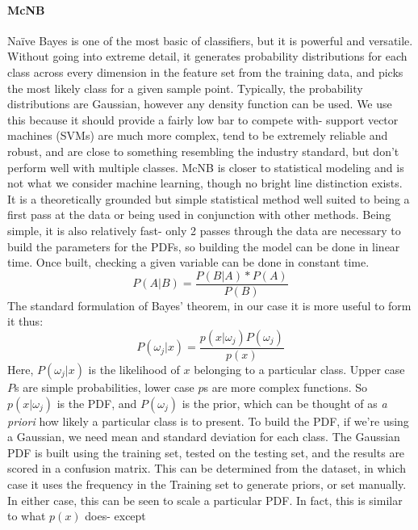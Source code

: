 \paragraph{McNB}
Na\"ive Bayes is one of the most basic of classifiers, but it is powerful and
versatile.  Without going into extreme detail, it generates probability
distributions for each class across every dimension in the feature set from the
training data, and picks the most likely class for a given sample point. 
Typically, the probability distributions are Gaussian, however any density
function can be used.   We use this because it should provide a fairly low bar
to compete with- support vector machines (SVMs) are much more complex, tend to
be extremely reliable and robust, and are close to something resembling the
industry standard, but don't perform well with multiple classes.  McNB is closer
to statistical modeling and is not what we consider machine learning, though no
bright line distinction exists.  It is a theoretically grounded but simple
statistical method well suited to being a first pass at the data or being used
in conjunction with other methods.  Being simple, it is also relatively fast-
only 2 passes through the data are necessary to build the parameters for the
PDFs, so building the model can be done in linear time.  Once built, checking a
given variable can be done in constant time.
\begin{equation}
P(A|B) = \frac{P(B|A)*P(A)}{P(B)}
\end{equation}
The standard formulation of Bayes' theorem, in our case it is more useful to
form it thus:
\begin{equation}
P(\omega_j|x) = \frac{p(x|\omega_j)P(\omega_j)}{p(x)}
\label{eq:bayes}
\end{equation}
Here, $P(\omega_j|x)$ is the likelihood of $x$ belonging to a particular class.  Upper
case $P$s are simple probabilities, lower case $p$s are more complex functions.
So $p(x|\omega_j)$ is the PDF, and $P(\omega_j)$ is the prior, which can be
thought of as \textit{a priori} how likely a particular class is to present.  To
build the PDF, if we're using a Gaussian, we need mean and standard deviation
for each class.  The Gaussian PDF is built using the training set, tested on the
testing set, and the results are scored in a confusion matrix.  This can be
determined from the dataset, in which case it uses the frequency in the Training
set to generate priors, or set manually.  In either case, this can be seen to
scale a particular PDF.  In fact, this is similar to what $p(x)$ does- except
